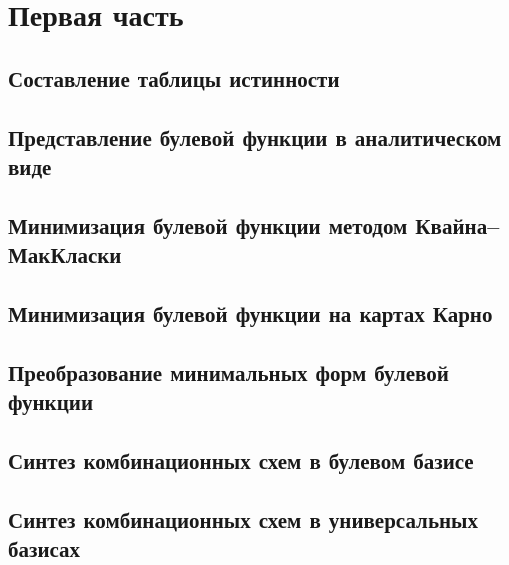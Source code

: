 \documentclass[a4paper, 11pt]{article}
\begin{document}


\tableofcontents
\vspace{2em}
\pagebreak{}

\section{Первая часть}

\subsection{Составление таблицы истинности}

\subsection{Представление булевой функции в аналитическом виде}

\subsection{Минимизация булевой функции методом Квайна–МакКласки}

\subsection{Минимизация булевой функции на картах Карно}

\subsection{Преобразование минимальных форм булевой функции}

\subsection{Синтез комбинационных схем в булевом базисе}

\subsection{Синтез комбинационных схем в универсальных базисах}

\end{document}
